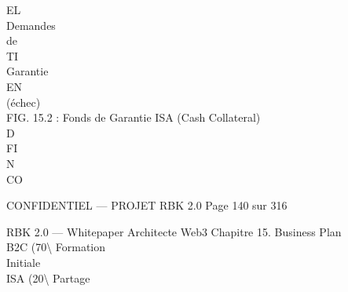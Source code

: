 \vspace{0.5em}
\vspace{0.5em}
\vspace{0.5em}
\vspace{0.5em}
EL\\
Demandes\\
de\\
\vspace{0.5em}
\vspace{0.5em}
\vspace{0.5em}
\vspace{0.5em}
TI\\
Garantie\\
\vspace{0.5em}
\vspace{0.5em}
\vspace{0.5em}
\vspace{0.5em}
EN\\
(échec)\\
\vspace{0.5em}
FIG. 15.2 : Fonds de Garantie ISA (Cash Collateral)\\
\vspace{0.5em}
\vspace{0.5em}
\vspace{0.5em}
\vspace{0.5em}
D\\
FI\\
N\\
CO\\
\vspace{0.5em}
\vspace{0.5em}
\vspace{0.5em}
\vspace{0.5em}
\begin{confidential}CONFIDENTIEL — PROJET RBK 2.0                                  Page 140 sur 316\end{confidential}
RBK 2.0 — Whitepaper Architecte Web3                                                 Chapitre 15. Business Plan\\
\vspace{0.5em}
\vspace{0.5em}
B2C (70\textbackslash{}%
Formation\\
Initiale\\
\vspace{0.5em}
\vspace{0.5em}
ISA (20\textbackslash{}%
Partage\\
